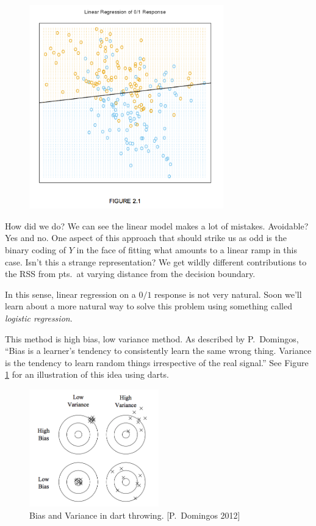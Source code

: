 \documentclass[a4paper]{article}
\begin{document}
\begin{figure}
\centering
\includegraphics[width=0.75\textwidth]{HTFfig2_1.png}
\end{figure}


How did we do?  We can see the linear model makes a lot of mistakes.  Avoidable?  Yes and no.  One aspect of this approach that should strike us as odd is the binary coding of $Y$ in the face of fitting what amounts to a linear ramp in this case.  Isn't this a strange representation?  We get wildly different contributions to the RSS from pts.\ at varying distance from the decision boundary.

In this sense, linear regression on a $0/1$ response is not very natural.  Soon we'll learn about a more natural way to solve this problem using something called \emph{logistic regression}.

This method is high bias, low variance method. As described by P.~Domingos, ``Bias is a learner’s tendency to consistently learn the same wrong thing. Variance is the tendency to learn random things irrespective of the real signal.'' See Figure \ref{fig:darts} for an illustration of this idea using darts.

\begin{figure}
\centering
\includegraphics[width=0.5\textwidth]{dartboard.png}
\caption{Bias and Variance in dart throwing. [P.~Domingos 2012]}
\label{fig:darts}
\end{figure}
\end{document}
